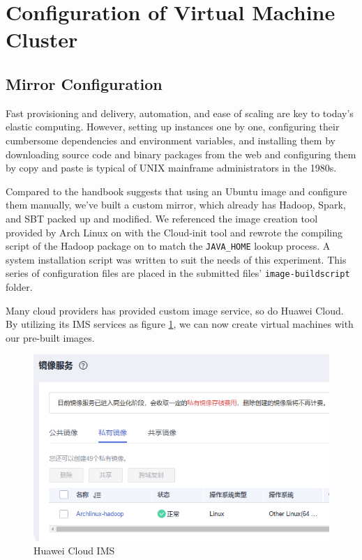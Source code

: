 \section{Configuration of Virtual Machine Cluster}

\subsection{Mirror Configuration}

Fast provisioning and delivery, automation, and ease of scaling are key to today's elastic computing. However, setting up instances one by one, configuring their cumbersome dependencies and environment variables, and installing them by downloading source code and binary packages from the web and configuring them by copy and paste is typical of UNIX mainframe administrators in the 1980s.

Compared to the handbook \cite{li-chao} suggests that using an Ubuntu image and configure them manually, we've built a custom mirror, which already has Hadoop, Spark, and SBT packed up and modified. We referenced the image creation tool provided by Arch Linux on \cite{Arch-box} with the Cloud-init tool and rewrote the compiling script of the Hadoop package on \cite{hadoop-package} to match the \texttt{JAVA\_HOME} lookup process. A system installation script was written to suit the needs of this experiment. This series of configuration files are placed in the submitted files' \texttt{image-buildscript} folder.

Many cloud providers has provided custom image service, so do Huawei Cloud. By utilizing its IMS services \cite{IMS} as figure \ref{fig:ims}, we can now create virtual machines with our pre-built images.

\begin{figure}[ht]
    \centering
    \includegraphics[width=\figurewidth]{figure/hadoop-image.png}
    \caption{Huawei Cloud IMS}
    \label{fig:ims}
\end{figure}

